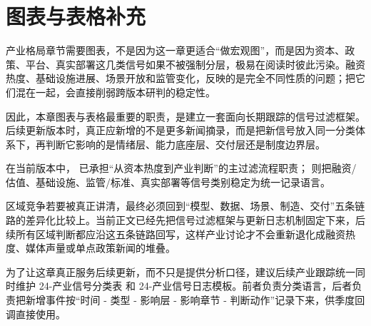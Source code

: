 \section*{图表与表格补充}

产业格局章节需要图表，不是因为这一章更适合“做宏观图”，而是因为资本、政策、平台、真实部署这几类信号如果不被强制分层，极易在阅读时彼此污染。融资热度、基础设施进展、场景开放和监管变化，反映的是完全不同性质的问题；把它们混在一起，会直接削弱跨版本研判的稳定性。

因此，本章图表与表格最重要的职责，是建立一套面向长期跟踪的信号过滤框架。后续更新版本时，真正应新增的不是更多新闻摘录，而是把新信号放入同一分类体系下，再判断它影响的是情绪层、能力底座层、交付层还是制度边界层。

在当前版本中，\texttt{} 已承担“从资本热度到产业判断”的主过滤流程职责；\texttt{} 则把融资/估值、基础设施、监管/标准、真实部署等信号类别稳定为统一记录语言。

区域竞争若要被真正讲清，最终必须回到“模型、数据、场景、制造、交付”五条链路的差异化比较上。当前正文已经先把信号过滤框架与更新日志机制固定下来，后续所有区域判断都应沿这五条链路回写，这样产业讨论才不会重新退化成融资热度、媒体声量或单点政策新闻的堆叠。

为了让这章真正服务后续更新，而不只是提供分析口径，建议后续产业跟踪统一同时维护 24-产业信号分类表 和 24-产业信号日志模板。前者负责分类语言，后者负责把新增事件按“时间 - 类型 - 影响层 - 影响章节 - 判断动作”记录下来，供季度回调直接使用。
